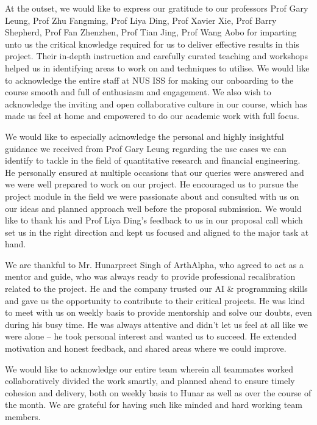 \begin{acknowledgements}
At the outset, we would like to express our gratitude to our professors Prof Gary Leung, Prof Zhu Fangming, Prof Liya Ding, Prof Xavier Xie, Prof Barry Shepherd, Prof Fan Zhenzhen, Prof Tian Jing, Prof Wang Aobo for imparting unto us the critical knowledge required for us to deliver effective results in this project. Their in-depth instruction and carefully curated teaching and workshops helped us in identifying areas to work on and techniques to utilise. We would like to acknowledge the entire staff at NUS ISS for making our onboarding to the course smooth and full of enthusiasm and engagement. We also wish to acknowledge the inviting and open collaborative culture in our course, which has made us feel at home and empowered to do our academic work with full focus.

We would like to especially acknowledge the personal and highly insightful guidance we received from Prof Gary Leung regarding the use cases we can identify to tackle in the field of quantitative research and financial engineering. He personally ensured at multiple occasions that our queries were answered and we were well prepared to work on our project. He encouraged us to pursue the project module in the field we were passionate about and consulted with us on our ideas and planned approach well before the proposal submission. We would like to thank his and Prof Liya Ding's feedback to us in our proposal call which set us in the right direction and kept us focused and aligned to the major task at hand.

We are thankful to Mr. Hunarpreet Singh of ArthAlpha, who agreed to act as a mentor and guide, who was always ready to provide professional recalibration related to the project. He and the company trusted our AI \& programming skills and gave us the opportunity to contribute to their critical projects. He was kind to meet with us on weekly basis to provide mentorship and solve our doubts, even during his busy time. He was always attentive and didn't let us feel at all like we were alone -- he took personal interest and wanted us to succeed. He extended motivation and honest feedback, and shared areas where we could improve. 

We would like to acknowledge our entire team wherein all teammates worked collaboratively divided the work smartly, and planned ahead to ensure timely cohesion and delivery, both on weekly basis to Hunar as well as over the course of the month. We are grateful for having such like minded and hard working team members.


\end{acknowledgements}
